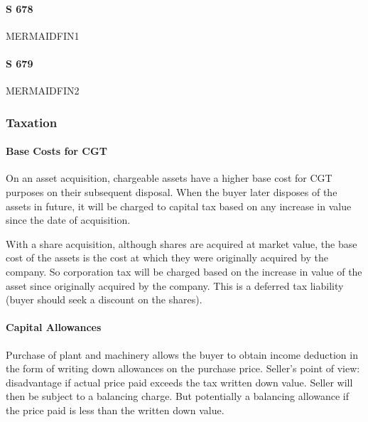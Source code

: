 \documentclass[
]{article}
\begin{document}
\hypertarget{s-678}{%
\paragraph{S 678}\label{s-678}}

MERMAIDFIN1

\hypertarget{s-679}{%
\paragraph{S 679}\label{s-679}}

MERMAIDFIN2

\hypertarget{taxation}{%
\subsubsection{Taxation}\label{taxation}}

\hypertarget{base-costs-for-cgt}{%
\paragraph{Base Costs for CGT}\label{base-costs-for-cgt}}

On an asset acquisition, chargeable assets have a higher base cost for
CGT purposes on their subsequent disposal. When the buyer later disposes
of the assets in future, it will be charged to capital tax based on any
increase in value since the date of acquisition.

With a share acquisition, although shares are acquired at market value,
the base cost of the assets is the cost at which they were originally
acquired by the company. So corporation tax will be charged based on the
increase in value of the asset since originally acquired by the company.
This is a deferred tax liability (buyer should seek a discount on the
shares).

\hypertarget{capital-allowances}{%
\paragraph{Capital Allowances}\label{capital-allowances}}

Purchase of plant and machinery allows the buyer to obtain income
deduction in the form of writing down allowances on the purchase price.
Seller's point of view: disadvantage if actual price paid exceeds the
tax written down value. Seller will then be subject to a balancing
charge. But potentially a balancing allowance if the price paid is less
than the written down value.
\end{document}
